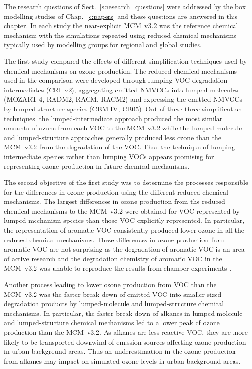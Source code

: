 The research questions of Sect.~\ref{s:research_questions} were addressed by the box modelling studies of Chap.~\ref{c:papers} and these questions are answered in this chapter.
In each study the near-explicit MCM~v3.2 was the reference chemical mechanism with the simulations repeated using reduced chemical mechanisms typically used by modelling groups for regional and global studies.

The first study compared the effects of different simplification techniques used by chemical mechanisms on ozone production.
The reduced chemical mechanisms used in the comparison were developed through lumping VOC degradation intermediates (CRI~v2), aggregating emitted NMVOCs into lumped molecules (MOZART-4, RADM2, RACM, RACM2) and expressing the emitted NMVOCs by lumped structure species (CBM-IV, CB05).
Out of these three simplification techniques, the lumped-intermediate approach produced the most similar amounts of ozone from each VOC to the MCM~v3.2 while the lumped-molecule and lumped-structure approaches generally produced less ozone than the MCM~v3.2 from the degradation of the VOC.
Thus the technique of lumping intermediate species rather than lumping VOCs appears promising for representing ozone production in future chemical mechanisms.

The second objective of the first study was to determine the processes responsible for the differences in ozone production using the different reduced chemical mechanisms.
The largest differences in ozone production from the reduced chemical mechanisms to the MCM~v3.2 were obtained for VOC represented by lumped mechanism species than those VOC explicitly represented.
In particular, the representation of aromatic VOC consistently produced lower ozone in all the reduced chemical mechanisms.
These differences in ozone production from aromatic VOC are not surprising as the degradation of aromatic VOC is an area of active research and the degradation chemistry of aromatic VOC in the MCM~v3.2 was unable to reproduce the results from chamber experiments \citep{Bloss:2005}.

Another process leading to lower ozone production from VOC than the MCM~v3.2 was the faster break down of emitted VOC into smaller sized degradation products by lumped-molecule and lumped-structure chemical mechanisms.
In particular, the faster break down of alkanes in lumped-molecule and lumped-structure chemical mechanisms led to a lower peak of ozone production than the MCM~v3.2.
As alkanes are less-reactive VOC, they are more likely to be transported downwind of emission sources affecting ozone production in urban background areas.
Thus an underestimation in the ozone production from alkanes may impact on simulated ozone levels in urban background areas.

